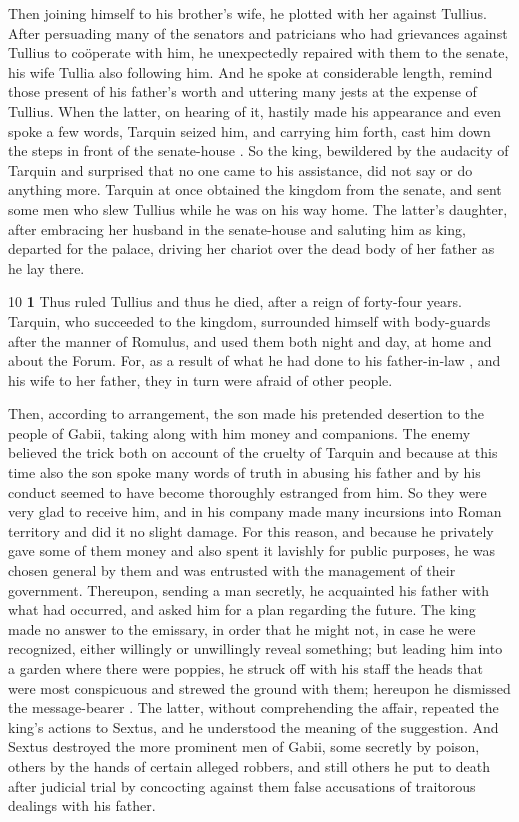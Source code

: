 Then joining himself to his brother's wife, he plotted with her against Tullius. After persuading many of the senators and patricians who had grievances against Tullius to coöperate with him, he unexpectedly repaired with them to the senate, his wife Tullia also following him. And he spoke at considerable length, remind those present of his father's worth and uttering many jests at the expense of Tullius. When the latter, on hearing of it, hastily made his appearance and even spoke a few words, Tarquin seized him, and carrying him forth, cast him down the steps in front of the senate-house . So the king, bewildered by the audacity of Tarquin and surprised that no one came to his assistance, did not say or do anything more. Tarquin at once obtained the kingdom from the senate, and sent some men who slew Tullius while he was on his way home. The latter's daughter, after embra­cing her husband in the senate-house and saluting him as king, departed for the palace, driving her chariot over the dead body of her father as he lay there.

10
\textbf{1} Thus ruled Tullius and thus he died, after a reign of forty-four years. Tarquin, who succeeded to the kingdom, surrounded himself with body-guards after the manner of Romulus, and used them both night and day, at home and about the Forum. For, as a result of what he had done to his father-in\texthebrew{‑}law , and his wife to her father, they in turn were afraid of other people.

Then, according to arrangement, the son made his pretended desertion to the people of Gabii, taking along with him money and companions. The enemy believed the trick both on account of the cruelty of Tarquin and because at this time also the son spoke many words of truth in abusing his father and by his conduct seemed to have become thoroughly estranged from him. So they were very glad to receive him, and in his company made many incursions into Roman territory and did it no slight damage. For this reason, and because he privately gave some of them money and also spent it lavishly for public purposes, he was chosen general by them and was entrusted with the management of their government. Thereupon, sending a man secretly, he acquainted his father with what had occurred, and asked him for a plan regarding the future. The king made no answer to the emissary, in order that he might not, in case he were recognized, either willingly or unwillingly reveal something; but leading him into a garden where there were poppies, he struck off with his staff the heads that were most conspicuous and strewed the ground with them; hereupon he dismissed the message-bearer . The latter, without comprehending the affair, repeated the king's actions to Sextus, and he understood the meaning of the suggestion. And Sextus destroyed the more prominent men of Gabii, some secretly by poison, others by the hands of certain alleged robbers, and still others he put to death after judicial trial by concocting against them false accusations of traitorous dealings with his father.

